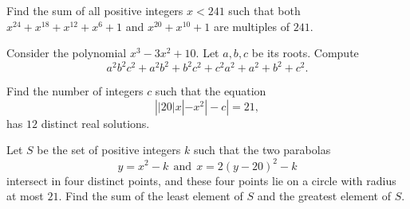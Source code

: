 %	



\begin{question}[name={2020-21 CHMMC Winter, Tiebreaker Round, \href{https://artofproblemsolving.com/community/c126h2426280p20002356}{Problem 2}}]
	Find the sum of all positive integers $x < 241$ such that both $x^{24} + x^{18} + x^{12} + x^6 + 1$ and $x^{20} + x^{10} + 1$ are multiples of $241$.	
\end{question}




%	


\begin{question}[name={2020-21 CHMMC Winter, Tiebreaker Round, \href{https://artofproblemsolving.com/community/c126h2426287p20002417}{Problem 7}}]
	Consider the polynomial $x^3-3x^2+10$. Let $a, b, c$ be its roots. Compute $$a^2b^2c^2 + a^2b^2 + b^2c^2 + c^2a^2 + a^2 + b^2 + c^2.$$
\end{question}




%	



\begin{question}[name={2021 AIME I, \href{https://artofproblemsolving.com/community/c4p20872589}{Problem 8}}]
	Find the number of integers $c$ such that the equation$$\left||20|x|-x^2|-c\right|=21,$$
	has $12$ distinct real solutions.
\end{question}


%	












\begin{question}[name={2021 AIME I, \href{https://artofproblemsolving.com/community/c4p20872801}{Problem 15}}]
	Let $S$ be the set of positive integers $k$ such that the two parabolas$$y=x^2-k~~\text{and}~~x=2(y-20)^2-k$$intersect in four distinct points, and these four points lie on a circle with radius at most $21$. Find the sum of the least element of $S$ and the greatest element of $S$.
\end{question}


